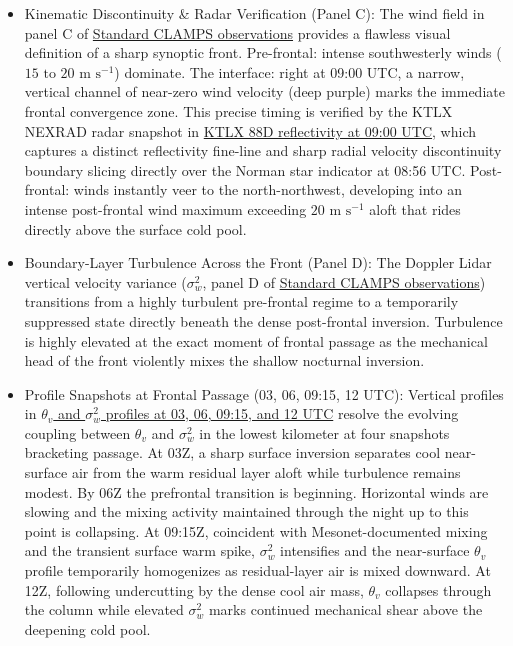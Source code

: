 \documentclass[11pt]{article}
\begin{document}
\begin{itemize}
  \item Kinematic Discontinuity \& Radar Verification (Panel C): The wind field in panel C of \hyperref[fig:fropa_c2:fropa_c2_instrument_template_4panel]{Standard CLAMPS observations} provides a flawless visual definition of a sharp synoptic front. Pre-frontal: intense southwesterly winds ($15\text{ to }20\text{ m s}^{-1}$) dominate. The interface: right at 09:00 UTC, a narrow, vertical channel of near-zero wind velocity (deep purple) marks the immediate frontal convergence zone. This precise timing is verified by the KTLX NEXRAD radar snapshot in \hyperref[fig:fropa_c2:fropa_c2_ktlx_88d_20230327_0900]{KTLX 88D reflectivity at 09:00 UTC}, which captures a distinct reflectivity fine-line and sharp radial velocity discontinuity boundary slicing directly over the Norman star indicator at 08:56 UTC. Post-frontal: winds instantly veer to the north-northwest, developing into an intense post-frontal wind maximum exceeding $20\text{ m s}^{-1}$ aloft that rides directly above the surface cold pool.
  \item Boundary-Layer Turbulence Across the Front (Panel D): The Doppler Lidar vertical velocity variance ($\sigma_w^2$, panel D of \hyperref[fig:fropa_c2:fropa_c2_instrument_template_4panel]{Standard CLAMPS observations}) transitions from a highly turbulent pre-frontal regime to a temporarily suppressed state directly beneath the dense post-frontal inversion. Turbulence is highly elevated at the exact moment of frontal passage as the mechanical head of the front violently mixes the shallow nocturnal inversion.
  \item Profile Snapshots at Frontal Passage (03, 06, 09:15, 12 UTC): Vertical profiles in \hyperref[fig:fropa_c2:fropa_c2_aux_front_theta_sigma_profiles]{$\theta_v$ and $\sigma_w^2$ profiles at 03, 06, 09:15, and 12 UTC} resolve the evolving coupling between $\theta_v$ and $\sigma_w^2$ in the lowest kilometer at four snapshots bracketing passage. At 03Z, a sharp surface inversion separates cool near-surface air from the warm residual layer aloft while turbulence remains modest. By 06Z the prefrontal transition is beginning. Horizontal winds are slowing and the mixing activity maintained through the night up to this point is collapsing. At 09:15Z, coincident with Mesonet-documented mixing and the transient surface warm spike, $\sigma_w^2$ intensifies and the near-surface $\theta_v$ profile temporarily homogenizes as residual-layer air is mixed downward. At 12Z, following undercutting by the dense cool air mass, $\theta_v$ collapses through the column while elevated $\sigma_w^2$ marks continued mechanical shear above the deepening cold pool.
\end{itemize}
\end{document}
